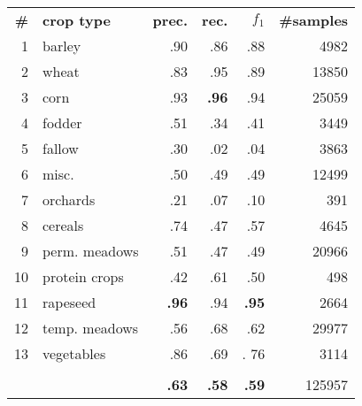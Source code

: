\begin{tabular}{rlrrrr}
\toprule
\textbf{\#} & \textbf{crop type} &  \textbf{prec.} & \textbf{rec.} & \textbf{$f_1$} & \textbf{\#samples} \\
\cmidrule(lr){1-1}\cmidrule(lr){2-2}\cmidrule(lr){3-3}\cmidrule(lr){4-4}\cmidrule(lr){5-5}\cmidrule(lr){6-6}
1 & barley &         .90 &          .86 &          .88 &     4982 \\
2 & wheat &         .83 &          .95 &          .89 &    13850 \\
3 & corn &         .93 &          \textbf{.96} &          .94 &    25059 \\
4 & fodder &         .51 &          .34 &          .41 &     3449 \\
5 & fallow &         .30 &           .02 &           .04 &     3863 \\
6 & misc. &         .50 &          .49 &          .49 &    12499 \\
7 & orchards &         .21 &           .07 &          .10 &      391 \\
8 & cereals &         .74 &          .47 &          .57 &     4645 \\
9 & perm. meadows &         .51 &          .47 &          .49 &    20966 \\
10 & protein crops &         .42 &          .61 &          .50 &      498 \\
11 & rapeseed &         \textbf{.96} &          .94 &          \textbf{.95} &     2664 \\
12 & temp. meadows &         .56 &          .68 &          .62 &    29977 \\
13 & vegetables &         .86 &          .69 &         . 76 &     3114 \\
   &                       &            &             &             &          \\
   &                       &         \textbf{.63} &          \textbf{.58} &          \textbf{.59} &   125957 \\
\bottomrule
\end{tabular}

